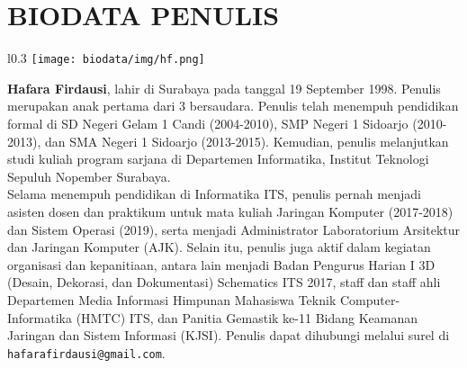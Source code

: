 \chapter{BIODATA PENULIS}
\begin{wrapfigure}{l}{0.3\textwidth}
	\texttt{[image: biodata/img/hf.png]}
\end{wrapfigure}

\textbf{Hafara Firdausi}, lahir di Surabaya pada tanggal 19 September 1998. Penulis merupakan anak pertama dari 3 bersaudara. Penulis telah menempuh pendidikan formal di SD Negeri Gelam 1 Candi (2004-2010), SMP Negeri 1 Sidoarjo (2010-2013), dan SMA Negeri 1 Sidoarjo (2013-2015). Kemudian, penulis melanjutkan studi kuliah program sarjana di Departemen Informatika, Institut Teknologi Sepuluh Nopember Surabaya.\\
\tab Selama menempuh pendidikan di Informatika ITS, penulis pernah menjadi asisten dosen dan praktikum untuk mata kuliah Jaringan Komputer (2017-2018) dan Sistem Operasi (2019), serta menjadi Administrator Laboratorium Arsitektur dan Jaringan Komputer (AJK). Selain itu, penulis juga aktif dalam kegiatan organisasi dan kepanitiaan, antara lain menjadi Badan Pengurus Harian I 3D (Desain, Dekorasi, dan Dokumentasi) Schematics ITS 2017, staff dan staff ahli Departemen Media Informasi Himpunan Mahasiswa Teknik Computer-Informatika (HMTC) ITS, dan Panitia Gemastik ke-11 Bidang Keamanan Jaringan dan Sistem Informasi (KJSI). Penulis dapat dihubungi melalui surel di  \texttt{hafarafirdausi@gmail.com}.